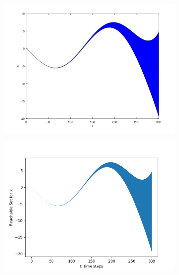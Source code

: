 \documentclass[EPiC]{easychair}
\begin{document}
\begin{figure}[h]

    \begin{subfigure}{0.5\textwidth}
    \centering
    \includegraphics[width=\textwidth]{SapoFigures/Rosslert/SapoRosslerX.jpg}
    \end{subfigure}
    \begin{subfigure}{0.6\textwidth}
    \centering
    \includegraphics[width=\textwidth]{SapoFigures/Rosslert/KaaRosslerX.png}
    \end{subfigure}
    

\end{figure}
\end{document}

